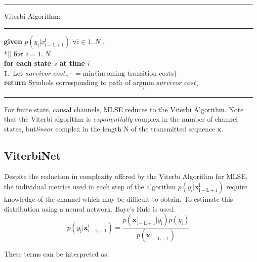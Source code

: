 \documentclass[12pt,a4paper]{report}
\begin{document}
    \noindent\rule[16pt]{\textwidth}{0.6pt}
	Viterbi Algorithm:

    \noindent\rule[10pt]{\textwidth}{0.4pt}
    {\footnotesize
    \begin{tabbing}
        {\bf given} $p(y_{\mathrm{i}}|x_{\mathrm{i-L+1}}^{\mathrm{i}}) \; \forall i \in {1..N}$ . \\*[\smallskipamount]
        {\bf for $i = 1..N $} \\
         \qquad \= {\bf for each state $s$ at time $i$}\\
        \qquad \qquad \= 1.\ Let $\textit{survivor cost}_{s}  += \text{min}\{\text{incoming transition costs}\}$ \\
        {\bf return} Symbols corresponding to path of $\underset{s}{\text{argmin}} \; \textit{survivor cost}_{s} $
    \end{tabbing}}
    \noindent\rule[10pt]{\textwidth}{0.4pt}


For finite state, causal channels, MLSE reduces to the Viterbi Algorithm. Note that the Viterbi algorithm is \emph{exponentially} complex in the number of channel states, but\emph{linear} complex in the length N of the transmitted sequence $\mathbf{x}$. 


\subsection{ViterbiNet}
Despite the reduction in complexity offered by the Viterbi Algorithm for MLSE, the individual metrics used in each step of the algorithm 
$p(y_{\mathrm{i}}|\mathbf{x}_{\mathrm{i-L+1}}^{\mathrm{i}}) $ require knowledge of the channel which may be difficult to obtain. To estimate this distribution using a neural network, Baye's Rule is used. 
\begin{equation}
p(y_{\mathrm{i}}|\mathbf{x}_{\mathrm{i-L+1}}^{\mathrm{i}}) = 
\frac
{p(\mathbf{x}_{\mathrm{i-L+1}}^{\mathrm{i}}|y_{\mathrm{i}})p(y_{\mathrm{i}})}
{p(\mathbf{x}_{\mathrm{i-L+1}}^{\mathrm{i}})}
\end{equation}

These terms can be interpreted as:
\end{document}
